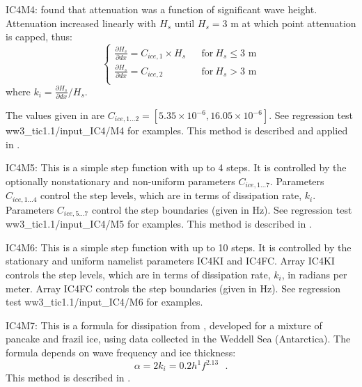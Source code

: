 {\code IC4M4}: \cite{art:Ko14} found that attenuation was a function of significant wave height. Attenuation increased linearly with ${H_s}$ until ${H_s} = 3$ m at which point attenuation is capped, thus:
\begin{equation}
\left \{
\begin{array}{llrcl}
{\frac{\partial H_s}{\partial dx}} = {C_{ice,1}}\times {H_s}   & & \text{for} \> {H_s} \leq 3 \text{ m}  \\
{\frac{\partial H_s}{\partial dx}} = {C_{ice,2}}               & & \text{for} \> {H_s} > 3 \text{ m}     \\
\end{array} \right .
\end{equation}
where {$k_i=\frac{\partial H_s}{\partial dx}/H_s$}.

The values given in \cite{art:Ko14} are ${C_{ice,1...2}}=[5.35\times 10^{-6}, 16.05\times 10^{-6}]$. See regression test {\file ww3\_tic1.1/input\_IC4/M4} for examples. This method is described and applied in \cite{rep:CR17}.

{\code IC4M5}: This is a simple step function with up to 4 steps. It is controlled by the optionally nonstationary and non-uniform parameters ${C_{ice,1...7}}$. Parameters ${C_{ice,1...4}}$ control the step levels, which are in terms of dissipation rate, ${k_i}$. Parameters ${C_{ice,5...7}}$ control the step boundaries (given in Hz). See regression test {\file ww3\_tic1.1/input\_IC4/M5} for examples. This method is described in \cite{rep:CR17}.

{\code IC4M6}: This is a simple step function with up to 10 steps. It is controlled by the stationary and uniform namelist parameters {\code IC4KI} and {\code IC4FC}. Array {\code IC4KI} controls the step levels, which are in terms of dissipation rate, ${k_i}$, in radians per meter. Array {\code IC4FC} controls the step boundaries (given in Hz). See regression test {\file ww3\_tic1.1/input\_IC4/M6} for examples. 

{\code IC4M7}: This is a formula for dissipation from \cite{art:Dob15}, developed for a mixture of pancake and frazil ice, using data collected in the Weddell Sea (Antarctica). The formula depends on wave frequency and ice thickness:
\begin{equation}\label{eq:ice7}
  {\alpha=2k_i=0.2h^1f^{2.13}} \:\:\: .
\end{equation}
This method is described in \cite{rep:RPLA18}.

